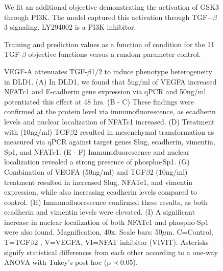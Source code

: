 \documentclass[11pt,letterpaper]{article}
\begin{document}
\begin{figure}
\caption{We fit an additional objective demonstrating the activation of GSK3 through PI3K. The model captured this activation through TGF$-\beta$3 signaling. LY294002 is a PI3K inhibitor.} 
\label{fg:gsk3_alone}
\end{figure}


\begin{figure}
  \caption{Training and prediction values as a function of condition for the 11 TGF-$\beta$ objective functions versus a random parameter control.}\label{fg:ObjTable}
\end{figure}

\begin{figure}
\caption{VEGF-A attenuates TGF-$\beta$1/2 to induce phenotype heterogeneity in DLD1.
(A) In DLD1, we found that 5ng/ml of VEGFA increased NFATc1 and E-cadherin gene expression via qPCR and 50ng/ml potentiated this effect at 48 hrs.
(B - C) These findings were confirmed at the protein level via immunofluorescence, as ecadherin levels and nuclear localization of NFATc1 increased.
(D) Treatment with (10ng/ml) TGF$\beta$2 resulted in mesenchymal transformation as measured via qPCR against target genes Slug, ecadherin, vimentin, Sp1, and NFATc1.
(E - F) Immunofluorescence and nuclear localization revealed a strong presence of phospho-Sp1.
(G) Combination of VEGFA (50ng/ml) and TGF$\beta$2 (10ng/ml) treatment resulted in increased Slug, NFATc1, and vimentin expression, while also increasing ecadherin levels compared to control.
(H) Immunofluorescence confirmed these results, as both ecadherin and vimentin levels were elevated.
(I) A significant increase in nuclear localization of both NFATc1 and phospho-Sp1 were also found.
Magnification, 40x. Scale bars: 50$\mu$m.  C=Control, T=TGF$\beta$2 , V=VEGFA, VI=NFAT inhibitor (VIVIT).
Asterisks signify statistical differences from each other according to a one-way ANOVA with Tukey's post hoc (p$\prec$0.05).}\label{fg:S3}
\end{figure}
\end{document}
